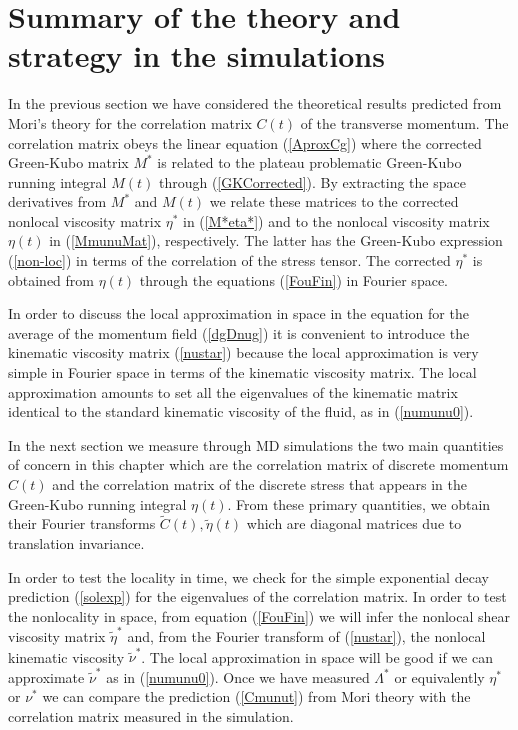 \documentclass[b5paper,openright,10pt]{book}
\begin{document}
\section{Summary of the theory and strategy in the simulations}
\label{Sec:Summary-TS}
In the  previous section  we have  considered the  theoretical results
predicted from Mori's theory for  the correlation matrix $C(t)$ of the
transverse momentum.  The correlation matrix obeys the linear equation
(\ref{AproxCg}) where the corrected Green-Kubo matrix $M^*$ is related
to the plateau problematic  Green-Kubo running integral $M(t)$ through
(\ref{GKCorrected}).  By  extracting the space derivatives  from $M^*$
and  $M(t)$  we  relate  these matrices  to  the  corrected  nonlocal
viscosity  matrix  $\eta^*$ in  (\ref{M*eta*})  and  to the  nonlocal
viscosity  matrix $\eta(t)$  in  (\ref{MmunuMat}), respectively.   The
latter has the  Green-Kubo expression (\ref{non-loc}) in  terms of the
correlation of the  stress tensor. The corrected  $\eta^*$ is obtained
from $\eta(t)$ through the equations (\ref{FouFin}) in Fourier space.

In order to  discuss the local approximation in space  in the equation
for the average of the  momentum field (\ref{dgDnug}) it is convenient
to introduce the kinematic viscosity matrix (\ref{nustar}) because the
local approximation  is very simple in  Fourier space in terms  of the
kinematic viscosity matrix. The local approximation amounts to set all
the  eigenvalues of  the kinematic  matrix identical  to the  standard
kinematic viscosity of the fluid, as in (\ref{numunu0}).

In the  next section we  measure through  MD simulations the  two main
quantities of concern  in this chapter which are  the correlation matrix
of discrete momentum $C(t)$ and the correlation matrix of the discrete
stress that appears in the Green-Kubo running integral $\eta(t)$. From
these  primary   quantities,  we   obtain  their   Fourier  transforms
$\tilde{C}(t),\tilde{\eta}(t)$  which  are  diagonal matrices  due  to
translation invariance.

In  order to  test  the locality  in  time, we  check  for the  simple
exponential decay prediction (\ref{solexp}) for the eigenvalues of the
correlation matrix.  In order to  test the nonlocality in space, from
equation  (\ref{FouFin}) we will infer the nonlocal shear viscosity matrix
$\tilde{\eta}^*$ and, from the  Fourier transform of (\ref{nustar}), the
nonlocal    kinematic   viscosity    $\tilde{\nu}^*$.    The    local
approximation  in   space  will   be  good   if  we   can  approximate
$\tilde{\nu}^*$  as   in  (\ref{numunu0}).   Once  we   have  measured
$\Lambda^*$ or  equivalently $\eta^*$  or $\nu^*$  we can  compare the
prediction (\ref{Cmunut}) from Mori theory with the correlation matrix
measured in the simulation.
\end{document}

